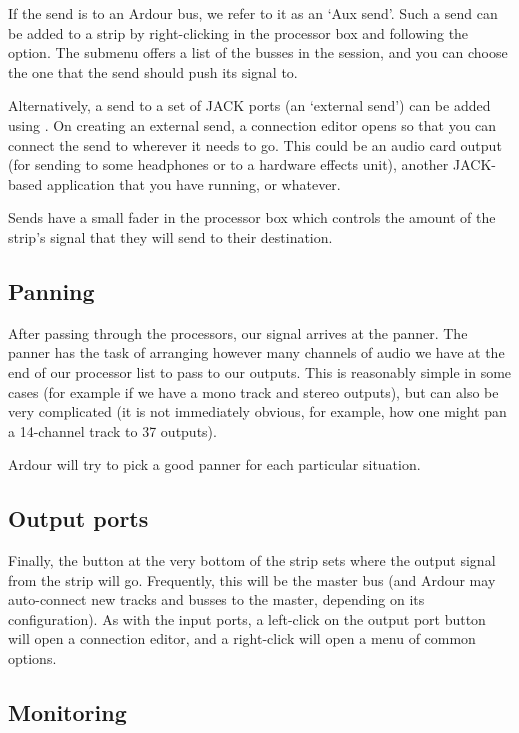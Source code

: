\documentclass[10pt,a4paper]{book}
\newcommand{\menu}[1]{\emph{\StrSubstitute{#1}{,}{ $\rightarrow$ }}}
\begin{document}
If the send is to an Ardour bus, we refer to it as an `Aux send'.
Such a send can be added to a strip by right-clicking in the processor
box and following the \menu{New Aux Send} option.  The submenu offers
a list of the busses in the session, and you can choose the one that
the send should push its signal to.

Alternatively, a send to a set of JACK ports (an `external send') can
be added using \menu{New External Send}.  On creating an external
send, a connection editor opens so that you can connect the send to
wherever it needs to go.  This could be an audio card output (for
sending to some headphones or to a hardware effects unit), another
JACK-based application that you have running, or whatever.

Sends have a small fader in the processor box which controls the
amount of the strip's signal that they will send to their destination.


\subsection{Panning}

After passing through the processors, our signal arrives at the
panner.  The panner has the task of arranging however many channels of
audio we have at the end of our processor list to pass to our outputs.
This is reasonably simple in some cases (for example if we have a mono
track and stereo outputs), but can also be very complicated (it is not
immediately obvious, for example, how one might pan a 14-channel track
to 37 outputs).

Ardour will try to pick a good panner for each particular situation.


\subsection{Output ports}

Finally, the button at the very bottom of the strip sets where the
output signal from the strip will go.  Frequently, this will be the
master bus (and Ardour may auto-connect new tracks and busses to the
master, depending on its configuration).  As with the input ports, a
left-click on the output port button will open a connection editor,
and a right-click will open a menu of common options.



\subsection{Monitoring}
\label{sec:monitoring}
\end{document}
